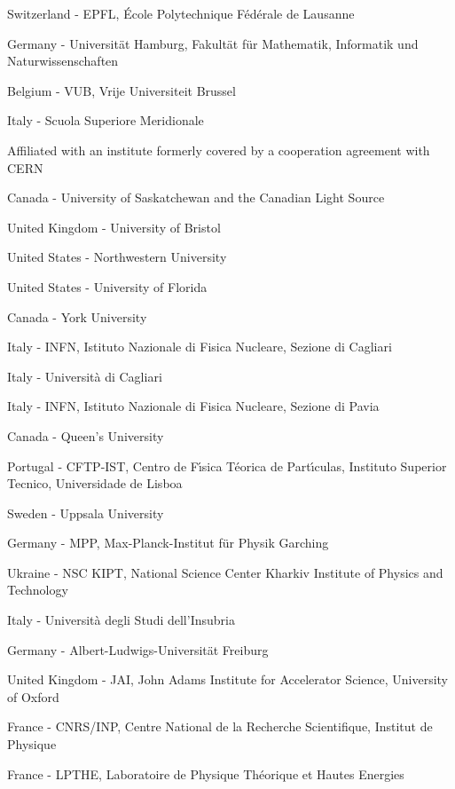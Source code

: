 \item[$^{119}$] Switzerland - EPFL, {\'E}cole Polytechnique F{\'e}d{\'e}rale de Lausanne
\item[$^{120}$] Germany - Universit{\"a}t Hamburg, Fakult{\"a}t f{\"u}r Mathematik, Informatik und Naturwissenschaften
\item[$^{121}$] Belgium - VUB, Vrije Universiteit Brussel 
\item[$^{122}$] Italy - Scuola Superiore Meridionale
\item[$^{123}$] Affiliated with an institute formerly covered by a cooperation agreement with CERN
\item[$^{124}$] Canada - University of Saskatchewan and the Canadian Light Source
\item[$^{125}$] United Kingdom - University of Bristol
\item[$^{126}$] United States - Northwestern University
\item[$^{127}$] United States - University of Florida
\item[$^{128}$] Canada - York University
\item[$^{129}$] Italy - INFN, Istituto Nazionale di Fisica Nucleare, Sezione di Cagliari
\item[$^{130}$] Italy - Universit{\`a} di Cagliari
\item[$^{131}$] Italy - INFN, Istituto Nazionale di Fisica Nucleare, Sezione di Pavia
\item[$^{132}$] Canada - Queen's University
\item[$^{133}$] Portugal - CFTP-IST, Centro de F{\'\i}sica T{\'e}orica de Part{\'\i}culas, Instituto Superior Tecnico, Universidade de Lisboa
\item[$^{134}$] Sweden - Uppsala University
\item[$^{135}$] Germany - MPP, Max-Planck-Institut f{\"u}r Physik Garching
\item[$^{136}$] Ukraine - NSC KIPT, National Science Center Kharkiv Institute of Physics and Technology
\item[$^{137}$] Italy - Universit{\`a} degli Studi dell'Insubria
\item[$^{138}$] Germany - Albert-Ludwigs-Universit{\"a}t Freiburg
\item[$^{139}$] United Kingdom - JAI, John Adams Institute for Accelerator Science, University of Oxford
\item[$^{140}$] France - CNRS/INP, Centre National de la Recherche Scientifique, Institut de Physique
\item[$^{141}$] France - LPTHE, Laboratoire de Physique Th{\'e}orique et Hautes Energies
